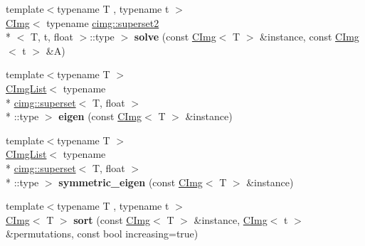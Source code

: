 \begin{DoxyCompactItemize}
\item 
\hypertarget{namespacecimg__library_a2e42c75cb2930a580f751f6c7c6b6df3}{{\footnotesize template$<$typename T , typename t $>$ }\\\hyperlink{structcimg__library_1_1_c_img}{C\-Img}$<$ typename \hyperlink{structcimg__library_1_1cimg_1_1superset2}{cimg\-::superset2}\\*
$<$ T, t, float $>$\-::type $>$ {\bfseries solve} (const \hyperlink{structcimg__library_1_1_c_img}{C\-Img}$<$ T $>$ \&instance, const \hyperlink{structcimg__library_1_1_c_img}{C\-Img}$<$ t $>$ \&A)}\label{namespacecimg__library_a2e42c75cb2930a580f751f6c7c6b6df3}

\item 
\hypertarget{namespacecimg__library_a36b7dddb7d45c0918418a47b9c333448}{{\footnotesize template$<$typename T $>$ }\\\hyperlink{structcimg__library_1_1_c_img_list}{C\-Img\-List}$<$ typename \\*
\hyperlink{structcimg__library_1_1cimg_1_1superset}{cimg\-::superset}$<$ T, float $>$\\*
\-::type $>$ {\bfseries eigen} (const \hyperlink{structcimg__library_1_1_c_img}{C\-Img}$<$ T $>$ \&instance)}\label{namespacecimg__library_a36b7dddb7d45c0918418a47b9c333448}

\item 
\hypertarget{namespacecimg__library_abb9acfcba2ac8a142bd529cc59d5d4a0}{{\footnotesize template$<$typename T $>$ }\\\hyperlink{structcimg__library_1_1_c_img_list}{C\-Img\-List}$<$ typename \\*
\hyperlink{structcimg__library_1_1cimg_1_1superset}{cimg\-::superset}$<$ T, float $>$\\*
\-::type $>$ {\bfseries symmetric\-\_\-eigen} (const \hyperlink{structcimg__library_1_1_c_img}{C\-Img}$<$ T $>$ \&instance)}\label{namespacecimg__library_abb9acfcba2ac8a142bd529cc59d5d4a0}

\item 
\hypertarget{namespacecimg__library_a53b0a40dcab5b29cf3534d3081e809f1}{{\footnotesize template$<$typename T , typename t $>$ }\\\hyperlink{structcimg__library_1_1_c_img}{C\-Img}$<$ T $>$ {\bfseries sort} (const \hyperlink{structcimg__library_1_1_c_img}{C\-Img}$<$ T $>$ \&instance, \hyperlink{structcimg__library_1_1_c_img}{C\-Img}$<$ t $>$ \&permutations, const bool increasing=true)}\label{namespacecimg__library_a53b0a40dcab5b29cf3534d3081e809f1}


\end{DoxyCompactItemize}

